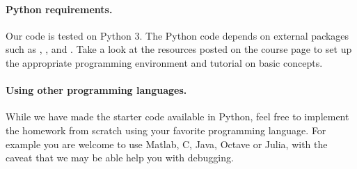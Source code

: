 \paragraph{Python requirements.}
Our code is tested on Python 3.
The Python code depends on external
packages such as , , and .
Take a look at the resources posted on the course page to set up the
appropriate programming environment and tutorial on basic concepts.


\paragraph{Using other programming languages.}
While we have made the starter code available in Python, 
feel free to implement the homework from scratch using your favorite
programming language. For example you are welcome to use Matlab, C, Java,
Octave or Julia, with the caveat that we may be able help you with
debugging.






